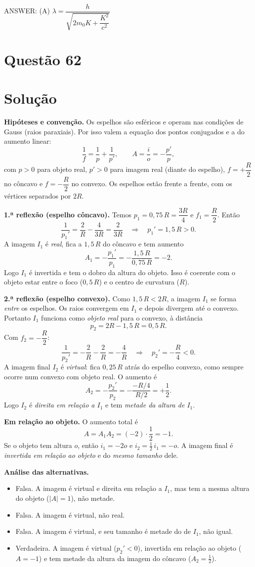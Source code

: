 \documentclass{article}%
\begin{document}
ANSWER: (A) $\lambda=\dfrac{h}{\sqrt{2m_0K+\dfrac{K^2}{c^2}}}$%
\newpage%
\section*{Questão 62}

\section*{Solução}

\textbf{Hipóteses e convenção.} Os espelhos são esféricos e operam nas condições de Gauss (raios paraxiais). Por isso valem a equação dos pontos conjugados e a do aumento linear:
\[
\frac{1}{f}=\frac{1}{p}+\frac{1}{p'},\qquad A=\frac{i}{o}=-\frac{p'}{p},
\]
com $p>0$ para objeto real, $p'>0$ para imagem real (diante do espelho), $f=+\dfrac{R}{2}$ no côncavo e $f=-\dfrac{R}{2}$ no convexo. Os espelhos estão frente a frente, com os vértices separados por $2R$.

\textbf{1.ª reflexão (espelho côncavo).} Temos $p_1=0{,}75\,R=\dfrac{3R}{4}$ e $f_1=\dfrac{R}{2}$. Então
\[
\frac{1}{p_1'}=\frac{2}{R}-\frac{4}{3R}=\frac{2}{3R}\quad\Longrightarrow\quad p_1'=1{,}5\,R>0 .
\]
A imagem $I_1$ é \emph{real}, fica a $1{,}5\,R$ do côncavo e tem aumento
\[
A_1=-\frac{p_1'}{p_1}=-\frac{1{,}5\,R}{0{,}75\,R}=-2 .
\]
Logo $I_1$ é invertida e tem o dobro da altura do objeto. Isso é coerente com o objeto estar entre o foco ($0{,}5\,R$) e o centro de curvatura ($R$).

\textbf{2.ª reflexão (espelho convexo).} Como $1{,}5\,R<2R$, a imagem $I_1$ se forma \emph{entre} os espelhos. Os raios convergem em $I_1$ e depois divergem até o convexo. Portanto $I_1$ funciona como \emph{objeto real} para o convexo, à distância
\[
p_2=2R-1{,}5\,R=0{,}5\,R .
\]
Com $f_2=-\dfrac{R}{2}$:
\[
\frac{1}{p_2'}=-\frac{2}{R}-\frac{2}{R}=-\frac{4}{R}\quad\Longrightarrow\quad p_2'=-\frac{R}{4}<0 .
\]
A imagem final $I_2$ é \emph{virtual}: fica $0{,}25\,R$ atrás do espelho convexo, como sempre ocorre num convexo com objeto real. O aumento é
\[
A_2=-\frac{p_2'}{p_2}=-\frac{-R/4}{R/2}=+\frac{1}{2}.
\]
Logo $I_2$ é \emph{direita em relação a $I_1$} e tem \emph{metade da altura de $I_1$}.

\textbf{Em relação ao objeto.} O aumento total é
\[
A=A_1A_2=(-2)\cdot\frac{1}{2}=-1 .
\]
Se o objeto tem altura $o$, então $i_1=-2o$ e $i_2=\tfrac12\,i_1=-o$. A imagem final é \emph{invertida em relação ao objeto} e do \emph{mesmo tamanho} dele.

\textbf{Análise das alternativas.}
\begin{itemize}
\item[a)] Falsa. A imagem é virtual e direita em relação a $I_1$, mas tem a mesma altura do objeto ($|A|=1$), não metade.
\item[b)] Falsa. A imagem é virtual, não real.
\item[c)] Falsa. A imagem é virtual, e seu tamanho é metade do de $I_1$, não igual.
\item[d)] Verdadeira. A imagem é virtual ($p_2'<0$), invertida em relação ao objeto ($A=-1$) e tem metade da altura da imagem do côncavo ($A_2=\tfrac12$).
\end{itemize}
\end{document}
